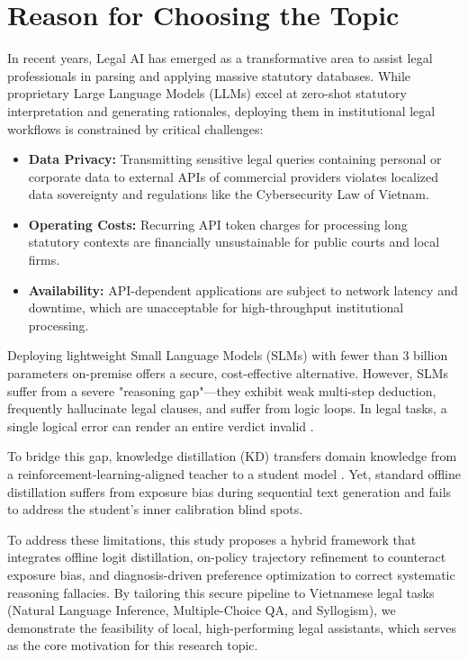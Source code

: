 \section{Reason for Choosing the Topic}

In recent years, Legal AI has emerged as a transformative area to assist legal professionals in parsing and applying massive statutory databases. While proprietary Large Language Models (LLMs) excel at zero-shot statutory interpretation and generating rationales, deploying them in institutional legal workflows is constrained by critical challenges:
\begin{itemize}
    \item \textbf{Data Privacy:} Transmitting sensitive legal queries containing personal or corporate data to external APIs of commercial providers violates localized data sovereignty and regulations like the Cybersecurity Law of Vietnam.
    \item \textbf{Operating Costs:} Recurring API token charges for processing long statutory contexts are financially unsustainable for public courts and local firms.
    \item \textbf{Availability:} API-dependent applications are subject to network latency and downtime, which are unacceptable for high-throughput institutional processing.
\end{itemize}

Deploying lightweight Small Language Models (SLMs) with fewer than 3 billion parameters on-premise offers a secure, cost-effective alternative. However, SLMs suffer from a severe "reasoning gap"---they exhibit weak multi-step deduction, frequently hallucinate legal clauses, and suffer from logic loops. In legal tasks, a single logical error can render an entire verdict invalid \parencite{li2026legaldrilldiagnosisdrivensynthesislegal, stacey2024distillingrobustnessnaturallanguage}.

To bridge this gap, knowledge distillation (KD) transfers domain knowledge from a reinforcement-learning-aligned teacher to a student model \parencite{hinton2015distillingknowledgeneuralnetwork}. Yet, standard offline distillation suffers from exposure bias during sequential text generation and fails to address the student's inner calibration blind spots. 

To address these limitations, this study proposes a hybrid framework that integrates offline logit distillation, on-policy trajectory refinement to counteract exposure bias, and diagnosis-driven preference optimization to correct systematic reasoning fallacies. By tailoring this secure pipeline to Vietnamese legal tasks (Natural Language Inference, Multiple-Choice QA, and Syllogism), we demonstrate the feasibility of local, high-performing legal assistants, which serves as the core motivation for this research topic.

